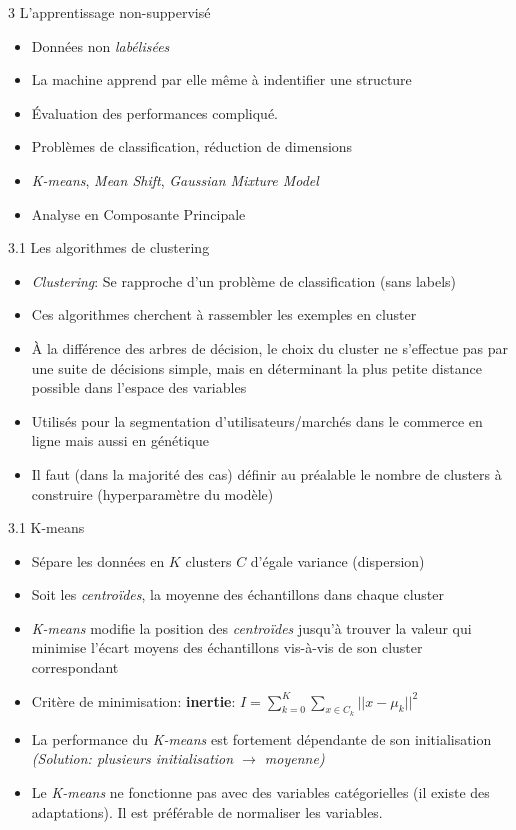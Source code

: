 \begin{frame}{3 L'apprentissage non-suppervisé}
  \begin{itemize}
  \item Données non \textit{labélisées}
  \item La machine apprend par elle même à indentifier une structure
  \item Évaluation des performances compliqué.
  \item Problèmes de classification, réduction de dimensions
  \item \textit{K-means}, \textit{Mean Shift}, \textit{Gaussian Mixture Model}
  \item Analyse en Composante Principale
  \end{itemize}  
\end{frame}

\begin{frame}{3.1 Les algorithmes de clustering}
  \begin{itemize}
  \item \textit{Clustering}: Se rapproche d'un problème de classification (sans labels)
  \item Ces algorithmes cherchent à rassembler les exemples en cluster
  \item À la différence des arbres de décision, le choix du cluster ne s'effectue pas par une suite de décisions simple, mais en déterminant la plus petite distance possible dans l'espace des variables
  \item Utilisés pour la segmentation d'utilisateurs/marchés dans le commerce en ligne mais aussi en génétique
  \item Il faut (dans la majorité des cas) définir au préalable le nombre de clusters à construire (hyperparamètre du modèle)
  \end{itemize}
\end{frame}

\begin{frame}{3.1 K-means}
  \begin{itemize}
  \item Sépare les données en $K$ clusters $C$ d'égale variance (dispersion)
  \item Soit les \textit{centroïdes}, la moyenne des échantillons dans chaque cluster
  \item \textit{K-means} modifie la position des \textit{centroïdes} jusqu'à trouver la valeur qui minimise l'écart moyens des échantillons vis-à-vis de son cluster correspondant
  \item Critère de minimisation: \textbf{inertie}: $I = \displaystyle\sum_{k=0}^{K}\displaystyle\sum_{x \in C_{k}} || x - \mu_{k} ||^{2}$
  \item La performance du \textit{K-means} est fortement dépendante de son initialisation \textit{(Solution: plusieurs initialisation $\rightarrow$ moyenne)}
  \item Le \textit{K-means} ne fonctionne pas avec des variables catégorielles (il existe des adaptations). Il est préférable de normaliser les variables.
  \end{itemize}
\end{frame}

